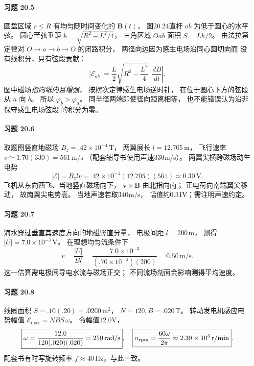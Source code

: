 \paragraph{习题 20.5}
圆盘区域 \(r\le R\) 有均匀随时间变化的
\(\boldsymbol B(t)\)，
图20.24直杆 \(ab\) 为低于圆心的水平弦。
圆心至弦垂距
\(h=\sqrt{R^2-L^2/4}\)，
三角区域 \(Oab\) 面积
\(S=Lh/2\)。
由法拉第定律对
\(O\to a\to b\to O\) 的闭路积分，
两径向边因为感生电场沿同心圆切向而
没有线积分，只有弦段贡献：
\[
 \boxed{|\mathcal E_{ab}|=
 \frac{L}{2}\sqrt{R^2-\frac{L^2}{4}}\,
 \left|\frac{dB}{dt}\right|}.
\]
图中磁场\emph{指向纸内且增强}，
按楞次定律感生电场逆时针，
在位于圆心下方的弦段从 \(a\) 向 \(b\)。
所以
\(\boxed{\varphi_b>\varphi_a}\)。
同半径两端即使径向距离相等，
也不能错误认为沿非保守感生电场弦段
的积分为零。

\paragraph{习题 20.6}
取题图竖直地磁场
\(B_z=.42\times10^{-4}\,\mathrm T\)，
两翼展长 \(l=12.705\,\mathrm m\)，
飞行速率
\(v\simeq1.70(330)=561\,\mathrm{m/s}\)
（配套辅导书使用声速330m/s）。
两翼尖横跨磁场动生电势
\[
 \boxed{|\mathcal E|=B_zlv
 =.42\times10^{-4}(12.705)(561)
 \approx0.30\,\mathrm V}.
\]
飞机从东向西飞、当地竖直磁场向下，
\(\boldsymbol v\times\boldsymbol B\)
由北指向南；
正电荷向南端翼尖移动，
故\(\boxed{\text{南翼尖电势高}}\)。
当地声速若取340m/s，
幅值约0.31V；需注明声速约定。

\paragraph{习题 20.7}
海水穿过垂直其速度方向的地磁竖直分量，
电极间距 \(l=200\,\mathrm m\)，
测得 \(|U|=7.0\times10^{-3}\,\mathrm V\)。
在理想均匀流条件下
\[
 \boxed{v=\frac{|U|}{Bl}
 =\frac{7.0\times10^{-3}}
 {(.70\times10^{-4})(200)}
 =0.50\,\mathrm{m/s}}.
\]
这一估算需电极间导电水流与磁场正交；
不同流场剖面会影响测得平均速度。

\paragraph{习题 20.8}
线圈面积 \(S=.10(.20)=.0200\,\mathrm{m^2}\)，
\(N=120,B=.020\,\mathrm T\)。
转动发电机感应电势幅值
\(\mathcal E_{\max}=NBS\,\omega\)。
令幅值12.0V，
\[
 \boxed{\omega=\frac{12.0}{120(.020)(.020)}
 =250\,\mathrm{rad/s}},
\quad
 \boxed{n_{\rm rpm}=\frac{60\omega}{2\pi}
 \approx2.39\times10^3\,\mathrm{r/min}}.
\]
配套书有时写旋转频率
\(f\approx40\,\mathrm{Hz}\)，与此一致。


